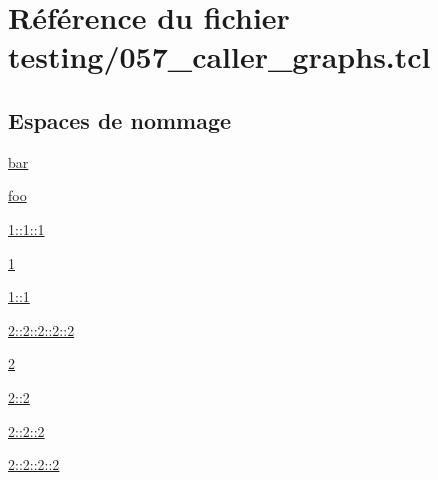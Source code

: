 \hypertarget{057__caller__graphs_8tcl}{}\section{Référence du fichier testing/057\+\_\+caller\+\_\+graphs.tcl}
\label{057__caller__graphs_8tcl}
\subsection*{Espaces de nommage}
\begin{DoxyCompactItemize}
\item 
 \hyperlink{namespacebar}{bar}
\item 
 \hyperlink{namespacefoo}{foo}
\item 
 \hyperlink{namespace1_1_11_1_11}{1\+::1\+::1}
\item 
 \hyperlink{namespace1}{1}
\item 
 \hyperlink{namespace1_1_11}{1\+::1}
\item 
 \hyperlink{namespace2_1_12_1_12_1_12_1_12}{2\+::2\+::2\+::2\+::2}
\item 
 \hyperlink{namespace2}{2}
\item 
 \hyperlink{namespace2_1_12}{2\+::2}
\item 
 \hyperlink{namespace2_1_12_1_12}{2\+::2\+::2}
\item 
 \hyperlink{namespace2_1_12_1_12_1_12}{2\+::2\+::2\+::2}
\end{DoxyCompactItemize}
